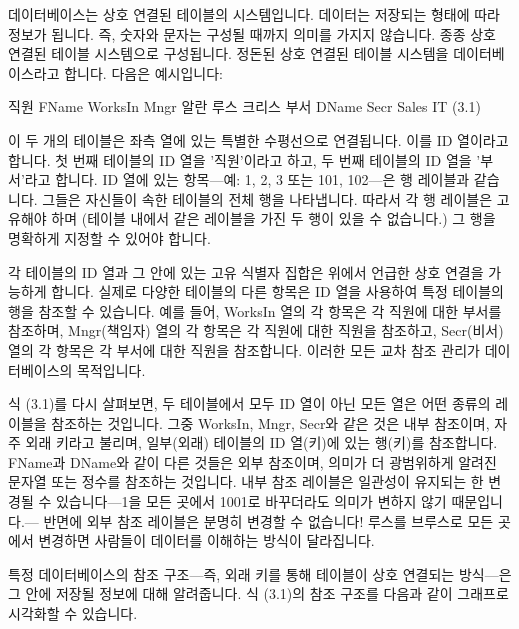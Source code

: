 \documentclass[11pt, a4paper, twoside, openany]{book}
\begin{document}
{\par\medskip
데이터베이스는 상호 연결된 테이블의 시스템입니다. 데이터는 저장되는 형태에 따라 정보가 됩니다. 즉, 숫자와 문자는 구성될 때까지 의미를 가지지 않습니다. 종종 상호 연결된 테이블 시스템으로 구성됩니다. 정돈된 상호 연결된 테이블 시스템을 데이터베이스라고 합니다. 다음은 예시입니다:

\par\medskip
직원
FName
WorksIn
Mngr
알란
루스
크리스
부서
DName
Secr
Sales
IT
(3.1)

\par\medskip
이 두 개의 테이블은 좌측 열에 있는 특별한 수평선으로 연결됩니다. 이를 ID 열이라고 합니다. 첫 번째 테이블의 ID 열을 '직원'이라고 하고, 두 번째 테이블의 ID 열을 '부서'라고 합니다. ID 열에 있는 항목—예: 1, 2, 3 또는 101, 102—은 행 레이블과 같습니다. 그들은 자신들이 속한 테이블의 전체 행을 나타냅니다. 따라서 각 행 레이블은 고유해야 하며 (테이블 내에서 같은 레이블을 가진 두 행이 있을 수 없습니다.) 그 행을 명확하게 지정할 수 있어야 합니다.

\par\medskip
각 테이블의 ID 열과 그 안에 있는 고유 식별자 집합은 위에서 언급한 상호 연결을 가능하게 합니다. 실제로 다양한 테이블의 다른 항목은 ID 열을 사용하여 특정 테이블의 행을 참조할 수 있습니다. 예를 들어, WorksIn 열의 각 항목은 각 직원에 대한 부서를 참조하며, Mngr(책임자) 열의 각 항목은 각 직원에 대한 직원을 참조하고, Secr(비서) 열의 각 항목은 각 부서에 대한 직원을 참조합니다. 이러한 모든 교차 참조 관리가 데이터베이스의 목적입니다.

\par\medskip
식 (3.1)를 다시 살펴보면, 두 테이블에서 모두 ID 열이 아닌 모든 열은 어떤 종류의 레이블을 참조하는 것입니다. 그중 WorksIn, Mngr, Secr\hspace{0pt}와 같은 것은 내부 참조이며, 자주 외래 키라고 불리며, 일부(외래) 테이블의 ID 열(키)에 있는 행(키)를 참조합니다. FName\hspace{0pt}과 DName\hspace{0pt}와 같이 다른 것들은 외부 참조이며, 의미가 더 광범위하게 알려진 문자열 또는 정수를 참조하는 것입니다. 내부 참조 레이블은 일관성이 유지되는 한 변경될 수 있습니다—1\hspace{0pt}을 모든 곳에서 1001\hspace{0pt}로 바꾸더라도 의미가 변하지 않기 때문입니다.— 반면에 외부 참조 레이블은 분명히 변경할 수 없습니다! 루스를 브루스로 모든 곳에서 변경하면 사람들이 데이터를 이해하는 방식이 달라집니다.

\par\medskip
특정 데이터베이스의 참조 구조—즉, 외래 키를 통해 테이블이 상호 연결되는 방식—은 그 안에 저장될 정보에 대해 알려줍니다. 식 (3.1)의 참조 구조를 다음과 같이 그래프로 시각화할 수 있습니다.

}
\end{document}
